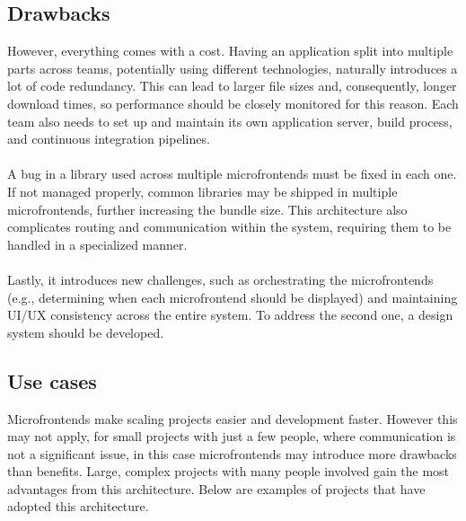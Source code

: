 \subsection{Drawbacks}
However, everything comes with a cost. Having an application split into multiple parts across teams, potentially using different technologies, naturally introduces a lot of code redundancy. This can lead to larger file sizes and, consequently, longer download times, so performance should be closely monitored for this reason. Each team also needs to set up and maintain its own application server, build process, and continuous integration pipelines. \\\\
\noindent
A bug in a library used across multiple microfrontends must be fixed in each one. If not managed properly, common libraries may be shipped in multiple microfrontends, further increasing the bundle size. This architecture also complicates routing and communication within the system, requiring them to be handled in a specialized manner. \\\\
\noindent
Lastly, it introduces new challenges, such as orchestrating the microfrontends (e.g., determining when each microfrontend should be displayed) and maintaining UI/UX consistency across the entire system. To address the second one, a design system should be developed.\cite{MicrofrontendsInAction}\cite{MFApplication}

\subsection{Use cases}
Microfrontends make scaling projects easier and development faster. However this may not apply, for small projects with just a few people, where communication is not a significant issue, in this case microfrontends may introduce more drawbacks than benefits. Large, complex projects with many people involved gain the most advantages from this architecture. Below are examples of projects that have adopted this architecture.  \\

